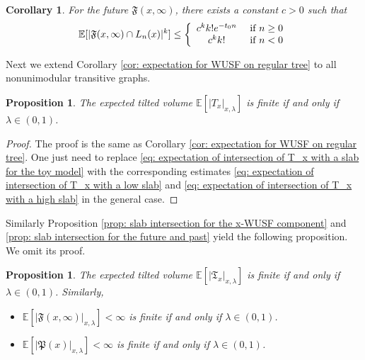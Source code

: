 \documentclass[12pt]{article}
\newtheorem{corollary}[theorem]{Corollary}
\newtheorem{proposition}[theorem]{Proposition}
\numberwithin{equation}{section}
\newcommand{\1}{\mathbf{1}}
\begin{document}
 
 
 
 
 
 
 
 
 
 
 
  \begin{corollary}\label{cor: high moments for the future intersect with a slab}
  	For the future $\mathfrak{F}(x,\infty)$, there exists a constant $c>0$ such that 
  	\[
  	\mathbb{E}[|\mathfrak{F}(x,\infty)\cap L_{n}(x)|^k]\leq 
  	\left\{
  	\begin{array}{cc}
  	c^kk!e^{-t_0n} & \textnormal{ if }n\geq0\\
  	c^kk!& \textnormal{ if }n<0
  	\end{array}
  	\right.
  	\]
  \end{corollary}
 
 
 
 Next we extend Corollary \ref{cor: expectation for WUSF on regular tree} to all nonunimodular transitive graphs. 
 \begin{proposition}\label{prop: expected tilted volume for WUSF component}
 	The expected tilted volume $\mathbb{E}[|T_x|_{x,\lambda}]$ is finite if and only if $\lambda\in (0,1)$. 
 \end{proposition}
 \begin{proof}
 	The proof is the same as Corollary \ref{cor: expectation for WUSF on regular tree}. One just need to replace  \eqref{eq: expectation of intersection of T_x with a slab for the toy model}  with the corresponding estimates \eqref{eq: expectation of intersection of T_x with a low slab} and \eqref{eq: expectation of intersection of T_x with a high slab} in the general case. 
 \end{proof}
 
 
 Similarly Proposition \ref{prop: slab intersection for the x-WUSF component} and \ref{prop: slab intersection for the future and past} yield the following proposition. We omit its proof. 
 
 \begin{proposition}\label{prop: tilted volume bounds for x-component, past and future}
 	The expected tilted volume $\mathbb{E}[|\mathfrak{T}_x|_{x,\lambda}]$ is finite if and only if $\lambda\in (0,1)$.
 Similarly,
 	\begin{itemize}
 		\item $\mathbb{E}[|\mathfrak{F}(x,\infty)|_{x,\lambda}]<\infty$ is finite if and only if $\lambda\in (0,1)$.
 		
 		
 		\item $\mathbb{E}[|\mathfrak{P}(x)|_{x,\lambda}]<\infty$ is finite if and only if $\lambda\in (0,1)$.
 		
 		
 		
 	\end{itemize}
 	
 \end{proposition}
 
\end{document}
